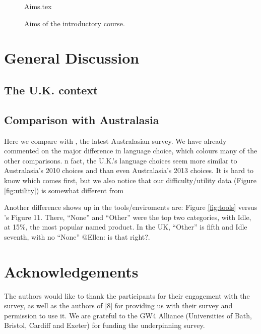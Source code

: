 \documentclass{sig-alternate}
\begin{document}
\begin{figure}
\begin{center}
{Aims.tex}
\end{center}\vskip-18pt
\caption{Aims of the introductory course. \label{fig:aims}}
\end{figure}

\section{General Discussion}\label{discussion}

\subsection{The U.K. context}

\subsection{Comparison with Australasia}

Here we compare with \cite{mason+cooper:2014}, the latest Australasian
survey. We have already commented on the major difference in language
choice, which colours many of the other comparisons. n fact, the
U.K.'s language choices seem more similar to Australasia's 2010
choices \cite{mason-et-al:2012} and \cite[Table 4]{mason+cooper:2014}
than even Australasia's 2013 choices. It is hard to know which comes
first, but we also notice that our difficulty/utility data (Figure
\ref{fig:utility}) is somewhat different from \cite[Figures
7,8]{mason+cooper:2014}

Another difference shows up in the tools/enviroments are: Figure
\ref{fig:tools} versus \cite{mason+cooper:2014}'s Figure 11. There,
``None'' and ``Other'' were the top two categories, with Idle, at
15\%, the most popular named product. In the UK, ``Other'' is fifth
and Idle seventh, with no ``None'' @Ellen: is that right?.


\section{Acknowledgements}

The authors would like to thank the participants for their engagement
with the survey, as well as the authors of [8] for providing us with
their survey and permission to use it.
We are grateful to the GW4 Alliance (Universities of Bath, Bristol,
Cardiff and Exeter) for funding the underpinning survey.


\end{document}
